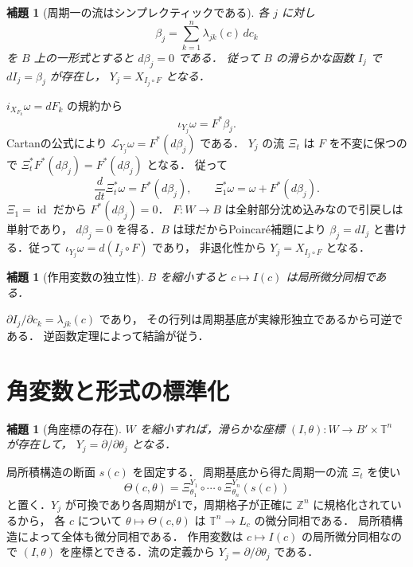 \documentclass[a5paper,10pt,onecolumn]{jsarticle}
\makeatletter
\theoremstyle{mathnotetheorem}
\newtheorem{lemma}[theorem]{補題}
\renewcommand{\proofname}{証明}
\renewenvironment{proof}[1][\proofname]{%
  \par\pushQED{\qed}\normalfont\topsep4\p@\@plus2\p@\relax
  \trivlist\item[\hskip\labelsep\bfseries #1]\ignorespaces
}{\popQED\endtrivlist\@endpefalse}
\makeatother
\begin{document}
\begin{lemma}[周期一の流はシンプレクティックである]
各 $j$ に対し
\[
 \beta_j=\sum_{k=1}^n\lambda_{jk}(c)\,dc_k
\]
を $B$ 上の一形式とすると $d\beta_j=0$ である．
従って $B$ の滑らかな函数 $I_j$ で $dI_j=\beta_j$ が存在し，
$Y_j=X_{I_j\circ F}$ となる．
\end{lemma}
\begin{proof}
$i_{X_{F_k}}\omega=dF_k$ の規約から
\[
 \iota_{Y_j}\omega=F^*\beta_j.
\]
Cartanの公式により
$\mathcal L_{Y_j}\omega=F^*(d\beta_j)$ である．
$Y_j$ の流 $\Xi_t$ は $F$ を不変に保つので
$\Xi_t^*F^*(d\beta_j)=F^*(d\beta_j)$ となる．
従って
\[
 \frac d{dt}\Xi_t^*\omega=F^*(d\beta_j),\qquad
 \Xi_1^*\omega=\omega+F^*(d\beta_j).
\]
$\Xi_1=\operatorname{id}$ だから $F^*(d\beta_j)=0$．
$F:W\to B$ は全射部分沈め込みなので引戻しは単射であり，
$d\beta_j=0$ を得る．$B$ は球だからPoincar\'e補題により
$\beta_j=dI_j$ と書ける．従って
$\iota_{Y_j}\omega=d(I_j\circ F)$ であり，
非退化性から $Y_j=X_{I_j\circ F}$ となる．
\end{proof}

\begin{lemma}[作用変数の独立性]
$B$ を縮小すると $c\mapsto I(c)$ は局所微分同相である．
\end{lemma}
\begin{proof}
$\partial I_j/\partial c_k=\lambda_{jk}(c)$ であり，
その行列は周期基底が実線形独立であるから可逆である．
逆函数定理によって結論が従う．
\end{proof}

\section{角変数と形式の標準化}
\begin{lemma}[角座標の存在]
$W$ を縮小すれば，滑らかな座標
$(I,\theta):W\to B'\times\mathbb T^n$ が存在して，
$Y_j=\partial/\partial\theta_j$ となる．
\end{lemma}
\begin{proof}
局所積構造の断面 $s(c)$ を固定する．
周期基底から得た周期一の流 $\Xi_t$ を使い
\[
 \Theta(c,\theta)=\Xi_{\theta_1}^{Y_1}\circ\cdots\circ
                        \Xi_{\theta_n}^{Y_n}(s(c))
\]
と置く．$Y_j$ が可換であり各周期が1で，周期格子が正確に
$\mathbb Z^n$ に規格化されているから，
各 $c$ について $\theta\mapsto\Theta(c,\theta)$ は
$\mathbb T^n\to L_c$ の微分同相である．
局所積構造によって全体も微分同相である．
作用変数は $c\mapsto I(c)$ の局所微分同相なので
$(I,\theta)$ を座標とできる．流の定義から
$Y_j=\partial/\partial\theta_j$ である．
\end{proof}
\end{document}

